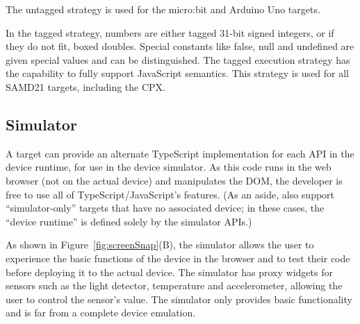 The untagged strategy is used for the micro:bit and Arduino Uno targets. 

In the tagged strategy, numbers are either tagged 31-bit signed integers, or if they do not fit, 
boxed doubles. Special constants like false, null and undefined are given special values 
and can be distinguished. The tagged execution strategy has the capability to fully support
JavaScript semantics. This strategy is used for all SAMD21 targets, including the CPX.

\subsection{Simulator}

A \MC target can provide an alternate TypeScript implementation for each API in the device runtime, for use in the device
simulator. As this code runs in the web browser (not on the actual device) and manipulates the DOM, the developer is free to
use all of TypeScript/JavaScript's features. (As an aside, \MC also support ``simulator-only'' targets that have no 
associated device; in these cases, the ``device runtime'' is defined solely by the simulator APIs.) 

As shown in Figure~\ref{fig:screenSnap}(B), the simulator allows the user to experience the basic functions of the device 
in the browser and to test their code
before deploying it to the actual device. The simulator has proxy widgets for sensors such as the 
light detector, temperature and accelerometer, allowing the user to control the sensor's value.  The simulator only provides basic functionality
and is far from a complete device emulation.  


